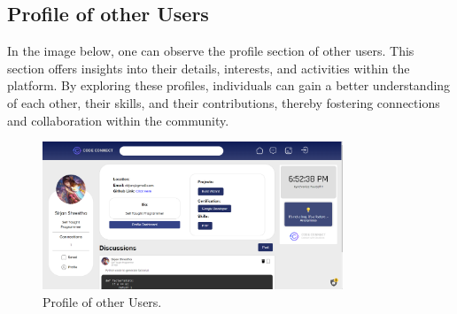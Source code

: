 \subsection{Profile of other Users}
In the image below, one can observe the profile section of other users. This section offers insights into their details, interests, and activities within the platform. By exploring these profiles, individuals can gain a better understanding of each other, their skills, and their contributions, thereby fostering connections and collaboration within the community.
\begin{figure}[H]
    \centering
    \includegraphics[width=0.8\textwidth]{Outcome-ss/other-user-profile.png}
    \caption{Profile of other Users.}
    \label{fig:Profile of other Users}
\end{figure}

